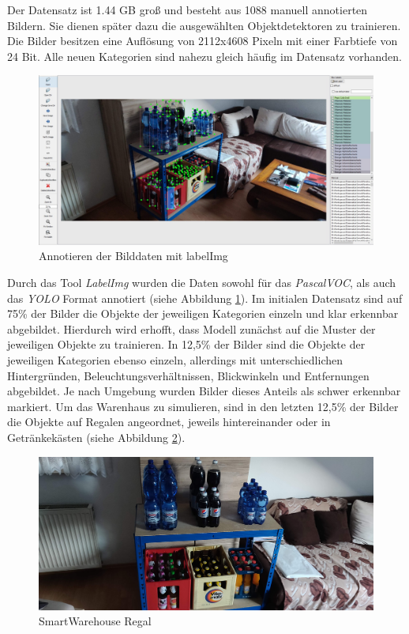 Der Datensatz ist 1.44 GB groß und besteht aus 1088 manuell annotierten Bildern. Sie dienen später dazu die ausgewählten Objektdetektoren zu trainieren. Die Bilder besitzen eine Auflösung von 2112x4608 Pixeln mit einer Farbtiefe von 24 Bit. Alle neuen Kategorien sind nahezu gleich häufig im Datensatz vorhanden. 

\begin{figure}[ht]
	\begin{center}
		\includegraphics[width=16cm]{Bilder/labelImg.jpeg} 
		\caption[Annotieren der Bilddaten mit labelImg]{Annotieren der Bilddaten mit labelImg}
		\label{labelImg}
	\end{center}
\end{figure}

Durch das Tool \textit{LabelImg} wurden die Daten sowohl für das \textit{PascalVOC}, als auch das \textit{YOLO} Format annotiert (siehe Abbildung \ref{labelImg}). Im initialen Datensatz sind auf 75\% der Bilder die Objekte der jeweiligen Kategorien einzeln und klar erkennbar abgebildet. Hierdurch wird erhofft, dass Modell zunächst auf die Muster der jeweiligen Objekte zu trainieren. In 12,5\% der Bilder sind die Objekte der jeweiligen Kategorien ebenso einzeln, allerdings mit unterschiedlichen Hintergründen, Beleuchtungsverhältnissen, Blickwinkeln und Entfernungen abgebildet. Je nach Umgebung wurden Bilder dieses Anteils als schwer erkennbar markiert. Um das Warenhaus zu simulieren, sind in den letzten 12,5\% der Bilder die Objekte auf Regalen angeordnet, jeweils hintereinander oder in Getränkekästen (siehe Abbildung \ref{regal}). 

\begin{figure}[ht]
	\begin{center}
		\includegraphics[width=16cm]{Bilder/regal.jpg} 
		\caption[Smart Warehouse Regal]{SmartWarehouse Regal}
		\label{regal}
	\end{center}
\end{figure}

